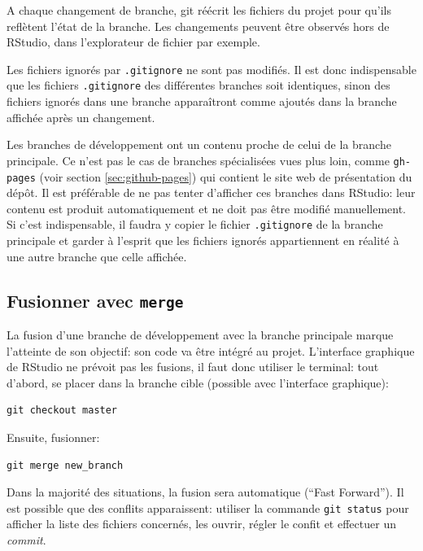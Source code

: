 \documentclass[
  11pt,
  french,
  a4paper,
  extrafontsizes,onecolumn,openright
  ]{memoir}
\begin{document}
A chaque changement de branche, git réécrit les fichiers du projet pour qu'ils reflètent l'état de la branche.
Les changements peuvent être observés hors de RStudio, dans l'explorateur de fichier par exemple.

Les fichiers ignorés par \texttt{.gitignore} ne sont pas modifiés.
Il est donc indispensable que les fichiers \texttt{.gitignore} des différentes branches soit identiques, sinon des fichiers ignorés dans une branche apparaîtront comme ajoutés dans la branche affichée après un changement.

Les branches de développement ont un contenu proche de celui de la branche principale.
Ce n'est pas le cas de branches spécialisées vues plus loin, comme \texttt{gh-pages} (voir section \ref{sec:github-pages}) qui contient le site web de présentation du dépôt.
Il est préférable de ne pas tenter d'afficher ces branches dans RStudio: leur contenu est produit automatiquement et ne doit pas être modifié manuellement.
Si c'est indispensable, il faudra y copier le fichier \texttt{.gitignore} de la branche principale et garder à l'esprit que les fichiers ignorés appartiennent en réalité à une autre branche que celle affichée.

\hypertarget{fusionner-avec-merge}{%
\subsection{\texorpdfstring{Fusionner avec \texttt{merge}}{Fusionner avec merge}}\label{fusionner-avec-merge}}

La fusion d'une branche de développement avec la branche principale marque l'atteinte de son objectif: son code va être intégré au projet.
L'interface graphique de RStudio ne prévoit pas les fusions, il faut donc utiliser le terminal: tout d'abord, se placer dans la branche cible (possible avec l'interface graphique):

\begin{verbatim}
git checkout master
\end{verbatim}

Ensuite, fusionner:

\begin{verbatim}
git merge new_branch
\end{verbatim}

Dans la majorité des situations, la fusion sera automatique (``Fast Forward'').
Il est possible que des conflits apparaissent: utiliser la commande \texttt{git\ status} pour afficher la liste des fichiers concernés, les ouvrir, régler le confit et effectuer un \emph{commit}.
\end{document}
